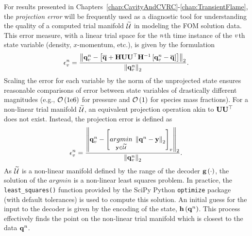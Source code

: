 For results presented in Chapters~\ref{chap:CavityAndCVRC}-\ref{chap:TransientFlame}, the \textit{projection error} will be frequently used as a diagnostic tool for understanding the quality of a computed trial manifold $\trialSpace$ in modeling the FOM solution data. This error measure, with a linear trial space for the $n$th time instance of the $v$th state variable (density, $x$-momentum, etc.), is given by the formulation
%
\begin{equation}\label{eq:projErrLinear}
    \errVecVar^\timeIdx = \frac{\left\Vert \stateVecVar^\timeIdx - \left[\stateVecCent + \scaleMat \basisMat \basisMat^\top \scaleMatInv \left[ \stateVecVar^\timeIdx - \stateVecCent \right] \right] \right\Vert_2}{\left\Vert \stateVecVar^\timeIdx \right\Vert_2}.
\end{equation}
%
Scaling the error for each variable by the norm of the unprojected state ensures reasonable comparisons of error between state variables of drastically different magnitudes (e.g., $\mathcal{O}\left(1\text{e}6\right)$ for pressure and $\mathcal{O}\left(1\right)$ for species mass fractions). For a non-linear trial manifold $\trialSpace$, an equivalent projection operation akin to $\basisMat \basisMat^\top$ does not exist. Instead, the projection error is defined as
%
\begin{equation}\label{eq:projErrNonlin}
    \errVecVar^\timeIdx = \frac{\left\Vert \stateVecVar^\timeIdx - \left[ \argmin{\dummyVec \in \trialSpace} \left\Vert \stateVec^\timeIdx - \dummyVec \right\Vert_2 \right]_{\varIdx} \right\Vert_2}{\left\Vert \stateVecVar^\timeIdx \right\Vert_2}.
\end{equation}
%
As $\trialSpace$ is a non-linear manifold defined by the range of the decoder $\mathbf{g} \left(\cdot\right)$, the solution of the $argmin$ is a non-linear least squares problem. In practice, the \verb|least_squares()| function provided by the SciPy Python \texttt{optimize} package (with default tolerances) is used to compute this solution. An initial guess for the input to the decoder is given by the encoding of the state, $\mathbf{h} \left(\mathbf{q}^{n}\right)$. This process effectively finds the point on the non-linear trial manifold which is closest to the data $\mathbf{q}^{n}$.

